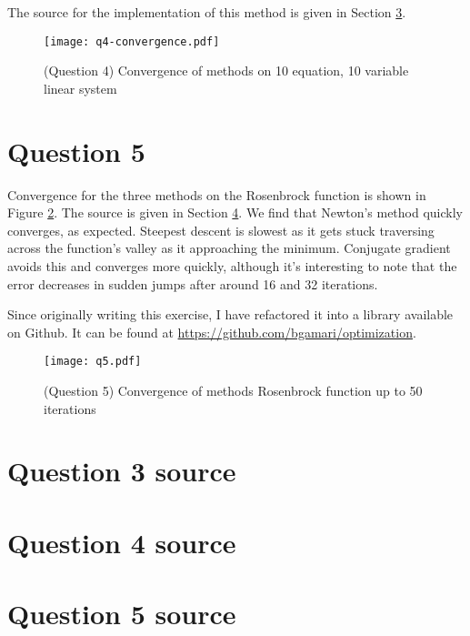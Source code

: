 \documentclass{article}
\begin{document}
The source for the implementation of this method is given in Section
\ref{Q4Source}.

\begin{figure}
  \center
  \texttt{[image: q4-convergence.pdf]}
  \caption{(Question 4) Convergence of methods on 10 equation, 10 variable linear system}
  \label{Fig:Q4Convergence}
\end{figure}

\section{Question 5}

Convergence for the three methods on the Rosenbrock function is shown
in Figure \ref{Fig:Q5Convergence}. The source is given in Section
\ref{Q5Source}. We find that Newton's method quickly converges, as
expected. Steepest descent is slowest as it gets stuck traversing
across the function's valley as it approaching the minimum. Conjugate
gradient avoids this and converges more quickly, although it's
interesting to note that the error decreases in sudden jumps after
around 16 and 32 iterations.

Since originally writing this exercise, I have refactored it into a
library available on Github. It can be found at
\url{https://github.com/bgamari/optimization}.

\begin{figure}
  \center
  \texttt{[image: q5.pdf]}
  \caption{(Question 5) Convergence of methods Rosenbrock function up to 50 iterations}
  \label{Fig:Q5Convergence}
\end{figure}

\appendix

\section{Question 3 source}\label{Q3Source}


\section{Question 4 source}\label{Q4Source}


\section{Question 5 source}\label{Q5Source}

\end{document}
